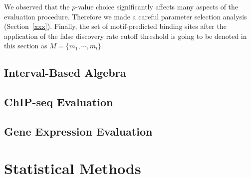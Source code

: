 We observed that the $p$-value choice significantly affects many aspects of the evaluation procedure. Therefore we made a careful parameter selection analysis (Section~\ref{xxx}). Finally, the set of motif-predicted binding sites after the application of the false discovery rate cutoff threshold is going to be denoted in this section as $M = \{ {m}_{1}, \cdots, {m}_{l} \}$.

\subsection{Interval-Based Algebra}
\label{sec:interval.based.algebra}






\subsection{ChIP-seq Evaluation}
\label{sec:chipseq.evaluation}




\subsection{Gene Expression Evaluation}
\label{sec:gene.expression.evaluation}












\section{Statistical Methods}
\label{sec:statistical.methods}












